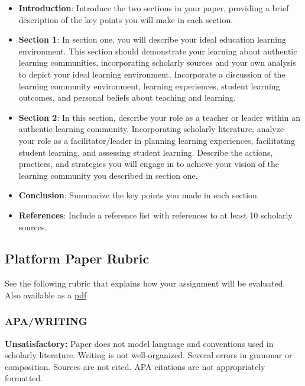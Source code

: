 \documentclass[
]{book}
\providecommand{\tightlist}{%
  \setlength{\itemsep}{0pt}\setlength{\parskip}{0pt}}
\begin{document}
\begin{assessment}
\begin{itemize}
\tightlist
\item
  \textbf{Introduction}: Introduce the two sections in your paper,
  providing a brief description of the key points you will make in each
  section.
\item
  \textbf{Section 1}: In section one, you will describe your ideal
  education learning environment. This section should demonstrate your
  learning about authentic learning communities, incorporating scholarly
  sources and your own analysis to depict your ideal learning
  environment. Incorporate a discussion of the learning community
  environment, learning experiences, student learning outcomes, and
  personal beliefs about teaching and learning.
\item
  \textbf{Section 2}: In this section, describe your role as a teacher
  or leader within an authentic learning community. Incorporating
  scholarly literature, analyze your role as a facilitator/leader in
  planning learning experiences, facilitating student learning, and
  assessing student learning. Describe the actions, practices, and
  strategies you will engage in to achieve your vision of the learning
  community you described in section one.
\item
  \textbf{Conclusion}: Summarize the key points you made in each
  section.
\item
  \textbf{References}: Include a reference list with references to at
  least 10 scholarly sources.
\end{itemize}
\end{assessment}

\hypertarget{platform-paper-rubric}{%
\subsection*{Platform Paper Rubric}\label{platform-paper-rubric}}

See the following rubric that explains how your assignment will be evaluated. Also available as a \href{assets/assessment/Platform-Paper-RUBRIC.pdf}{pdf}

\hypertarget{apawriting}{%
\subsubsection*{APA/WRITING}\label{apawriting}}

\textbf{Unsatisfactory:} Paper does not model language and conventions used in scholarly literature. Writing is not well-organized. Several errors in grammar or composition. Sources are not cited. APA citations are not appropriately formatted.
\end{document}
